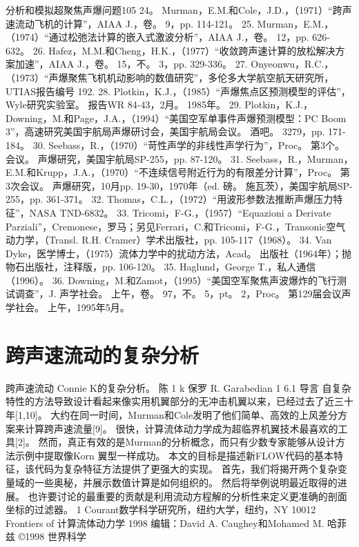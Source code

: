 \documentclass[UTF8,11pt,a4paper,openany,fontset=fandol]{ctexbook}
\begin{document}
分析和模拟超聚焦声爆问题105 24。 Murman，E.M.和Cole，J.D.，（1971）“跨声速流动飞机的计算”，AIAA J.，卷。 9，pp. 114-121。 25. Murman，E.M.，（1974）“通过松弛法计算的嵌入式激波分析”，AIAA J.，卷。 12，pp. 626-632。 26. Hafez，M.M.和Cheng，H.K.，（1977）“收敛跨声速计算的放松解决方案加速”，AIAA J.，卷。 15，不。 3，pp. 329-336。 27. Onyeonwu，R.C.，（1973）“声爆聚焦飞机机动影响的数值研究”，多伦多大学航空航天研究所，UTIAS报告编号 192. 28. Plotkin，K.J.，（1985）“声爆焦点区预测模型的评估”，Wyle研究实验室。 报告WR 84-43，2月。 1985年。 29. Plotkin，K.J.，Downing，M.和Page，J.A.，（1994）“美国空军单事件声爆预测模型：PC Boom 3”，高速研究美国宇航局声爆研讨会，美国宇航局会议。 酒吧。 3279，pp. 171-184。 30. Seebass，R.，（1970）“苛性声学的非线性声学行为”，Proc。 第3个。 会议。 声爆研究，美国宇航局SP-255，pp. 87-120。 31. Seebass，R.，Murman，E.M.和Krupp，J.A.，（1970）“不连续信号附近行为的有限差分计算”，Proc。 第3次会议。 声爆研究，10月pp. 19-30，1970年（ed. 磅。 施瓦茨），美国宇航局SP-255，pp. 361-371。 32. Thomas，C.L.，（1972）“用波形参数法推断声爆压力特征”，NASA TND-6832。 33. Tricomi，F-G.，（1957）“Equazioni a Derivate Parziali”，Cremonese，罗马；另见Ferrari，C.和Tricomi，F-G.，Transonic空气动力学，（Transl. R.H. Cramer）学术出版社，pp. 105-117（1968）。 34. Van Dyke，医学博士，（1975）流体力学中的扰动方法，Acad。 出版社（1964年）；抛物石出版社，注释版，pp. 106-120。 35. Haglund，George T.，私人通信（1996）。 36. Downing，M.和Zamot，（1995）“美国空军聚焦声波爆炸的飞行测试调查”，J. 声学社会。 上午，卷。 97，不。 5，pt。 2，Proc。 第129届会议声学社会。 上午，1995年5月。

\clearpage
\chapter{跨声速流动的复杂分析}
跨声速流动 Connie K的复杂分析。 陈 1 k 保罗 R. Garabedian 1 6.1 导言 自复杂特性的方法导致设计看起来像实用机翼部分的无冲击机翼以来，已经过去了近三十年[1,10]。 大约在同一时间，Murman和Cole发明了他们简单、高效的上风差分方案来计算跨声速流量[9]。 很快，计算流体动力学成为超临界机翼技术最喜欢的工具[2]。 然而，真正有效的是Murman的分析概念，而只有少数专家能够从设计方法示例中提取像Korn 翼型一样成功。 本文的目标是描述新FLOW代码的基本特征，该代码为复杂特征方法提供了更强大的实现。 首先，我们将揭开两个复杂变量域的一些奥秘，并展示数值计算是如何组织的。 然后将举例说明最近取得的进展。 也许要讨论的最重要的贡献是利用流动方程解的分析性来定义更准确的剖面坐标的过滤器。 1 Courant数学科学研究所，纽约大学，纽约，NY 10012 Frontiers of 计算流体动力学 1998 编辑：David A. Caughey和Mohamed M. 哈菲兹 ©1998 世界科学
\end{document}
